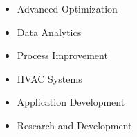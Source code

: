 

\begin{cvexpertise}
  \begin{itemize}
    \item Advanced Optimization
    \item Data Analytics
    \item Process Improvement
    \vfill
    \item HVAC Systems
    \item Application Development
    \item Research and Development
  \end{itemize}
\end{cvexpertise}


